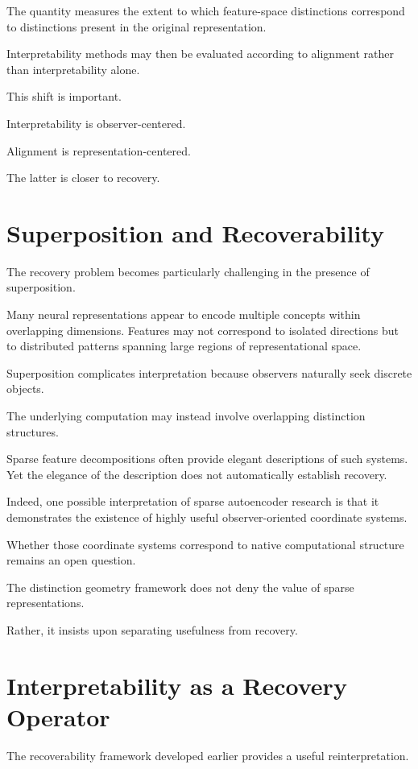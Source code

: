 \documentclass[11pt,oneside,openany]{book}
\begin{document}
The quantity measures the extent to which feature-space distinctions correspond to distinctions present in the original representation.

Interpretability methods may then be evaluated according to alignment rather than interpretability alone.

This shift is important.

Interpretability is observer-centered.

Alignment is representation-centered.

The latter is closer to recovery.

\section{Superposition and Recoverability}

The recovery problem becomes particularly challenging in the presence of superposition.

Many neural representations appear to encode multiple concepts within overlapping dimensions. Features may not correspond to isolated directions but to distributed patterns spanning large regions of representational space.

Superposition complicates interpretation because observers naturally seek discrete objects.

The underlying computation may instead involve overlapping distinction structures.

Sparse feature decompositions often provide elegant descriptions of such systems. Yet the elegance of the description does not automatically establish recovery.

Indeed, one possible interpretation of sparse autoencoder research is that it demonstrates the existence of highly useful observer-oriented coordinate systems.

Whether those coordinate systems correspond to native computational structure remains an open question.

The distinction geometry framework does not deny the value of sparse representations.

Rather, it insists upon separating usefulness from recovery.

\section{Interpretability as a Recovery Operator}

The recoverability framework developed earlier provides a useful reinterpretation.
\end{document}

